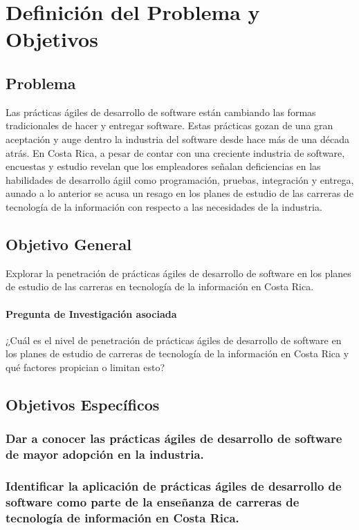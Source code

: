 \documentclass[journal]{IEEEtran}
\begin{document}
\section{Definición del Problema y Objetivos} \label{sec:problema-objetivos}

\subsection{Problema}
Las prácticas ágiles de desarrollo de software están cambiando las formas tradicionales de hacer y entregar software. Estas prácticas gozan de una gran aceptación y auge dentro la industria del software desde hace más de una década atrás. En Costa Rica, a pesar de contar con una creciente industria de software, encuestas y estudio revelan que los empleadores señalan deficiencias en las habilidades de desarrollo ágiil como programación, pruebas, integración y entrega, aunado a lo anterior se acusa un resago en los planes de estudio de las carreras de tecnología de la información con respecto a las necesidades de la industria.

\subsection{Objetivo General}
Explorar la penetración de prácticas ágiles de desarrollo de software en los planes de estudio de las carreras en tecnología de la información en Costa Rica.

\paragraph{Pregunta de Investigación asociada} ¿Cuál es el nivel de penetración de prácticas ágiles de desarrollo de software en los planes de estudio de carreras de tecnología de la información en Costa Rica y qué factores propician o limitan esto?


\subsection{Objetivos Específicos}

\subsubsection{Dar a conocer las prácticas ágiles de desarrollo de software de mayor adopción en la industria.} \label{sec:objetivo-especifico-1}

\subsubsection{Identificar la aplicación de prácticas ágiles de desarrollo de software como parte de la enseñanza de carreras de tecnología de información en Costa Rica.} \label{sec:objetivo-especifico-2}
\end{document}

